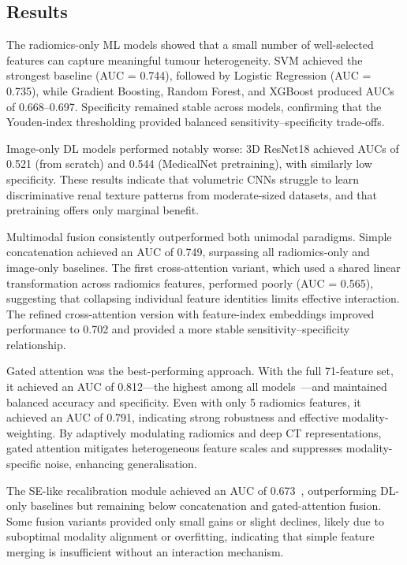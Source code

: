 \documentclass[final,british,a4paper,12pt]{phdthesis}
\begin{document}
\subsection{Results}

The radiomics-only ML models showed that a small number of well-selected features can capture meaningful tumour heterogeneity. SVM achieved the strongest baseline (AUC = 0.744), followed by Logistic Regression (AUC = 0.735), while Gradient Boosting, Random Forest, and XGBoost produced AUCs of 0.668–0.697. Specificity remained stable across models, confirming that the Youden-index thresholding provided balanced sensitivity–specificity trade-offs.

Image-only DL models performed notably worse: 3D ResNet18 achieved AUCs of 0.521 (from scratch) and 0.544 (MedicalNet pretraining), with similarly low specificity. These results indicate that volumetric CNNs struggle to learn discriminative renal texture patterns from moderate-sized datasets, and that pretraining offers only marginal benefit.

Multimodal fusion consistently outperformed both unimodal paradigms. Simple concatenation achieved an AUC of 0.749, surpassing all radiomics-only and image-only baselines. The first cross-attention variant, which used a shared linear transformation across radiomics features, performed poorly (AUC = 0.565), suggesting that collapsing individual feature identities limits effective interaction. The refined cross-attention version with feature-index embeddings improved performance to 0.702 and provided a more stable sensitivity–specificity relationship.

Gated attention was the best-performing approach. With the full 71-feature set, it achieved an AUC of 0.812—the highest among all models~\cite{qiu2024gated}—and maintained balanced accuracy and specificity. Even with only 5 radiomics features, it achieved an AUC of 0.791, indicating strong robustness and effective modality-weighting. By adaptively modulating radiomics and deep CT representations, gated attention mitigates heterogeneous feature scales and suppresses modality-specific noise, enhancing generalisation.

The SE-like recalibration module achieved an AUC of 0.673~\cite{hu2018squeeze}, outperforming DL-only baselines but remaining below concatenation and gated-attention fusion. Some fusion variants provided only small gains or slight declines, likely due to suboptimal modality alignment or overfitting, indicating that simple feature merging is insufficient without an interaction mechanism.
\end{document}
